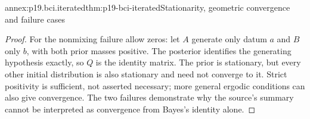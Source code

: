 \begin{annexitem}{annex:p19.bci.iterated}{thm:p19-bci-iterated}{Stationarity, geometric convergence and failure cases}
\begin{proof}
For the nonmixing failure allow zeros: let \(A\) generate only datum
\(a\) and \(B\) only \(b\), with both prior masses positive.
The posterior identifies the generating hypothesis exactly, so \(Q\)
is the identity matrix. The prior is stationary, but every other initial
distribution is also stationary and need not converge to it. Strict positivity
is sufficient, not asserted necessary; more general ergodic conditions
can also give convergence. The two failures demonstrate why the source's
summary cannot be interpreted as convergence from Bayes's identity alone.
\end{proof}
\end{annexitem}
